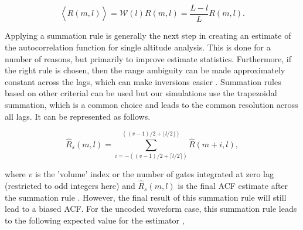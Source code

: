 \begin{equation}
\label{eq:lagprobias}
\left\langle\widehat{R}(m,l) \right\rangle = \mathcal{W}(l)R(m,l) =\frac{L-l}{L}R(m,l).
\end{equation}
%
%

Applying a summation rule is generally the next step in creating an estimate of the autocorrelation function for single altitude analysis. This is done for a number of reasons, but primarily to improve estimate statistics.  Furthermore, if the right rule is chosen, then the range ambiguity can be made approximately constant across the lags, which can make inversions easier \cite{nygren1996}. Summation rules based on other criterial can be used but our simulations use the trapezoidal summation, which is a common choice and leads to the common resolution across all lags. It can be represented as follows.

\begin{equation}
\label{eq:sumrule}
\widehat{R}_s(m,l) = \displaystyle\sum\limits_{i=-((v-1)/2+\lceil l/2 \rceil)}^{((v-1)/2+\lfloor l/2\rfloor)} \widehat{R}(m+i,l),
\end{equation}

\noindent where $v$ is the 'volume' index or the number of gates integrated at zero lag (restricted to odd integers here) and $\widehat{R}_s(m,l)$ is the final ACF estimate after the summation rule \cite{nygren1996}. 
However, the final result of this summation rule will still lead to a biased ACF. For the uncoded waveform case, this summation rule leads to the following expected value for the estimator \cite{nygren1996},

